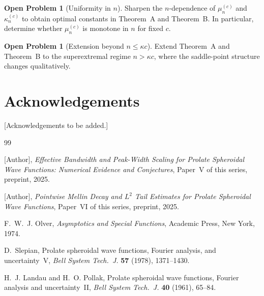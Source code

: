 \documentclass[12pt,a4paper]{amsart}
\theoremstyle{definition}
\newtheorem{problem}[theorem]{Open Problem}
\theoremstyle{remark}
\begin{document}
\begin{problem}[Uniformity in $n$]
\label{prob:uniformity}
Sharpen the $n$-dependence of
$\mu_n^{(c)}$ and $\kappa_n^{(c)}$
to obtain optimal constants in
Theorem~A and Theorem~B.
In particular, determine whether
$\mu_n^{(c)}$ is monotone in $n$
for fixed $c$.
\end{problem}

\begin{problem}[Extension beyond $n \le \kappa c$]
\label{prob:extension}
Extend Theorem~A and Theorem~B to the
superextremal regime $n > \kappa c$,
where the saddle-point structure changes
qualitatively.
\end{problem}

\section*{Acknowledgements}

[Acknowledgements to be added.]

\begin{thebibliography}{99}

[Author],
\textit{Effective Bandwidth and Peak-Width
Scaling for Prolate Spheroidal Wave Functions:
Numerical Evidence and Conjectures},
Paper~V of this series, preprint, 2025.

[Author],
\textit{Pointwise Mellin Decay and
$L^2$ Tail Estimates for Prolate Spheroidal
Wave Functions},
Paper~VI of this series, preprint, 2025.

F.~W.~J. Olver,
\textit{Asymptotics and Special Functions},
Academic Press, New York, 1974.

D.~Slepian,
Prolate spheroidal wave functions, Fourier
analysis, and uncertainty~V,
\textit{Bell System Tech.~J.}
\textbf{57} (1978), 1371--1430.

H.~J. Landau and H.~O. Pollak,
Prolate spheroidal wave functions, Fourier
analysis and uncertainty~II,
\textit{Bell System Tech.~J.}
\textbf{40} (1961), 65--84.

\end{thebibliography}
\end{document}
